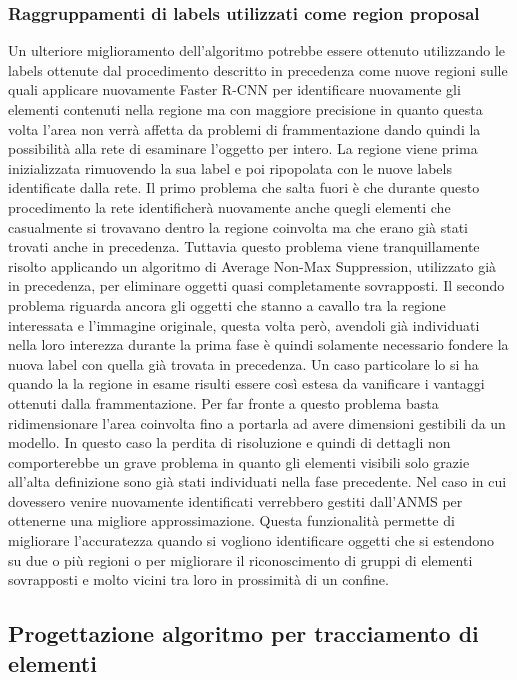 \subsubsection{Raggruppamenti di labels utilizzati come region proposal}
Un ulteriore miglioramento dell'algoritmo potrebbe essere ottenuto utilizzando le labels ottenute dal procedimento descritto in precedenza come nuove regioni sulle quali applicare nuovamente Faster R-CNN per identificare nuovamente gli elementi contenuti nella regione ma con maggiore precisione in quanto questa volta l'area non verrà affetta da problemi di frammentazione dando quindi la possibilità alla rete di esaminare l'oggetto per intero. La regione viene prima inizializzata rimuovendo la sua label e poi ripopolata con le nuove labels identificate dalla rete.
Il primo problema che salta fuori è che durante questo procedimento la rete identificherà nuovamente anche quegli elementi che casualmente si trovavano dentro la regione coinvolta ma che erano già stati trovati anche in precedenza. Tuttavia questo problema viene tranquillamente risolto applicando un algoritmo di Average Non-Max Suppression, utilizzato già in precedenza, per eliminare oggetti quasi completamente sovrapposti. Il secondo problema riguarda ancora gli oggetti che stanno a cavallo tra la regione interessata e l'immagine originale, questa volta però, avendoli già individuati nella loro interezza durante la prima fase è quindi solamente necessario fondere la nuova label con quella già trovata in precedenza. 
Un caso particolare lo si ha quando la la regione in esame risulti essere così estesa da vanificare i vantaggi ottenuti dalla frammentazione. Per far fronte a questo problema basta ridimensionare l'area coinvolta fino a portarla ad avere dimensioni gestibili da un modello. In questo caso la perdita di risoluzione e quindi di dettagli non comporterebbe un grave problema in quanto gli elementi visibili solo grazie all'alta definizione sono già stati individuati nella fase precedente. Nel caso in cui dovessero venire nuovamente identificati verrebbero gestiti dall'ANMS per ottenerne una migliore approssimazione. Questa funzionalità permette di migliorare l'accuratezza quando si vogliono identificare oggetti che si estendono su due o più regioni o per migliorare il riconoscimento di gruppi di elementi sovrapposti e molto vicini tra loro in prossimità di un confine.
\subsection{Progettazione algoritmo per tracciamento di elementi}
